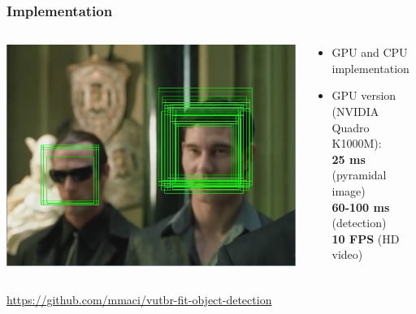 \documentclass{beamer}
\begin{document}
	\begin{frame}[t,fragile]
	\frametitle{Implementation}					
	\begin{columns}[onlytextwidth]
		\begin{column}{0.45\textwidth}
			\includegraphics[width=\textwidth]{img/detections.jpg}
		\end{column}	
	
		\begin{column}{0.5\textwidth}
		    \begin{itemize}
				\item GPU and CPU implementation
				\item GPU version \\ (NVIDIA Quadro K1000M): 
				\\ \textbf{25 ms} (pyramidal image)
				\\ \textbf{60-100 ms} (detection)
				\\ \textbf{10 FPS} (HD video)

			\end{itemize}
		\end{column}	
	\end{columns}		

	\begin{small}
		\vspace{5mm}
		\centering\url{https://github.com/mmaci/vutbr-fit-object-detection}	
	\end{small}	
	\end{frame}
	
\end{document}
